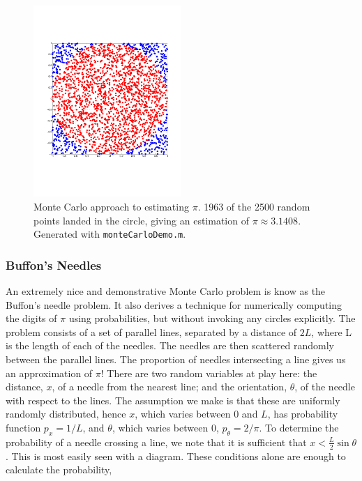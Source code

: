 \documentclass[11pt]{amsart}
\begin{document}
\begin{figure}[!ht]
\centering
\includegraphics[width=0.5\textwidth]{Figures/montecarlo.pdf}
\caption{Monte Carlo approach to estimating $\pi$. 1963 of the 2500 random points landed in the circle, giving an estimation of $\pi \approx 3.1408$. Generated with \texttt{monteCarloDemo.m}.}
\label{fig:montecarlo}
\end{figure}

\subsubsection{Buffon's Needles}
An extremely nice and demonstrative Monte Carlo problem is know as the Buffon's needle problem. It also derives a technique for numerically computing the digits of $\pi$ using probabilities, but without invoking any circles explicitly. The problem consists of a set of parallel lines, separated by a distance of $2L$, where L is the length of each of the needles. The needles are then scattered randomly between the parallel lines. The proportion of needles intersecting a line gives us an approximation of $\pi$! There are two random variables at play here: the distance, $x$, of a needle from the nearest line; and the orientation, $\theta$, of the needle with respect to the lines. The assumption we make is that these are uniformly randomly distributed, hence $x$, which varies between 0 and $L$, has probability function $p_x = 1/L$, and $\theta$, which varies between $0$, $p_{\theta} = 2/\pi$. To determine the probability of a needle crossing a line, we note that it is sufficient that $x < \frac{L}{2}\sin\theta$. This is most easily seen with a diagram. These conditions alone are enough to calculate the probability,
\end{document}
